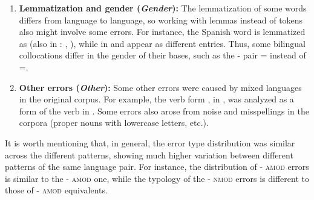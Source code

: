 \documentclass[output=paper
,modfonts
,nonflat]{langsci/langscibook}
\begin{document}
\begin{enumerate}
\item \textbf{Lemmatization and gender (\textit{Gender}):} The lemmatization of some words
  differs from language to language, so working with lemmas instead of
  tokens also might involve some errors. For instance, the Spanish word
   is lemmatized as 
  (also in : , ), while in  
  and  appear as different entries. Thus, some bilingual
  collocations differ in the gender of their bases, such as the
  - pair  =  instead of =.

\item \textbf{Other errors (\textit{Other}):} Some other errors were caused by mixed languages
  in the original corpus. For example, the verb form , in , was analyzed
  as a form of the verb  in . Some errors also arose from noise
  and misspellings in the corpora (proper nouns with lowercase letters, etc.).
\end{enumerate}

It is worth mentioning that, in general, the error type distribution was similar across
the different  patterns, showing much higher variation between different patterns
of the same language pair. For instance, the distribution of - \textsc{amod} errors
is similar to the - \textsc{amod} one, while the typology of the - \textsc{nmod}
errors is different to those of - \textsc{amod} equivalents.
\end{document}
